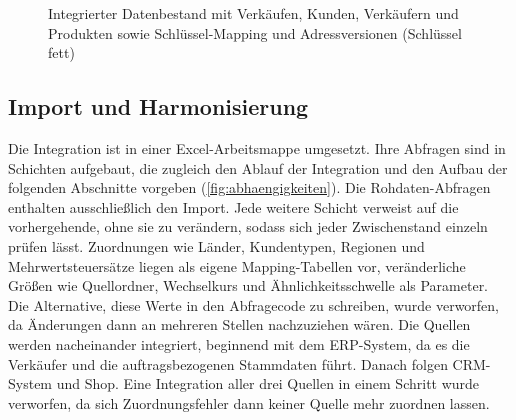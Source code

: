\documentclass[a4paper,12pt]{article}
\begin{document}
\begin{figure}[H]
{}
\caption{Integrierter Datenbestand mit Verkäufen, Kunden, Verkäufern und Produkten sowie Schlüssel-Mapping und Adressversionen (Schlüssel fett)}
\label{fig:zielschema}
\end{figure}

\subsection{Import und Harmonisierung}\label{sec:integration}

Die Integration ist in einer Excel-Arbeitsmappe umgesetzt. Ihre Abfragen sind in Schichten aufgebaut, die zugleich den Ablauf der Integration und den Aufbau der folgenden Abschnitte vorgeben (\cref{fig:abhaengigkeiten}). Die Rohdaten-Abfragen enthalten ausschließlich den Import. Jede weitere Schicht verweist auf die vorhergehende, ohne sie zu verändern, sodass sich jeder Zwischenstand einzeln prüfen lässt. Zuordnungen wie Länder, Kundentypen, Regionen und Mehrwertsteuersätze liegen als eigene Mapping-Tabellen vor, veränderliche Größen wie Quellordner, Wechselkurs und Ähnlichkeitsschwelle als Parameter. Die Alternative, diese Werte in den Abfragecode zu schreiben, wurde verworfen, da Änderungen dann an mehreren Stellen nachzuziehen wären. Die Quellen werden nacheinander integriert, beginnend mit dem ERP-System, da es die Verkäufer und die auftragsbezogenen Stammdaten führt. Danach folgen CRM-System und Shop. Eine Integration aller drei Quellen in einem Schritt wurde verworfen, da sich Zuordnungsfehler dann keiner Quelle mehr zuordnen lassen.
\end{document}

